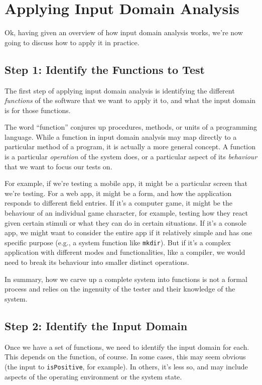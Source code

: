 \section{Applying Input Domain Analysis}

Ok, having given an overview of how input domain analysis works, we're now
going to discuss how to apply it in practice. 

\subsection*{Step 1: Identify the Functions to Test}

The first step of applying input domain analysis is identifying the different
{\it functions} of the software that we want to apply it to, and what the input
domain is for those functions. 

The word ``function'' conjures up procedures, methods, or units of a programming
language. While a function in input domain analysis may map directly to a
particular method of a program, it is actually a more general concept. A
function is a particular {\it operation} of the system does, or a particular
aspect of its {\it behaviour} that we want to focus our tests on. 

For example, if we're testing a mobile app, it might be a particular screen that
we're testing. For a web app, it might be a form, and how the application
responds to different field entries. If it's a computer game, it might be the
behaviour of an individual game character, for example, testing how they react
given certain stimuli or what they can do in certain situations. If it's a
console app, we might want to consider the entire app if it relatively simple
and has one specific purpose (e.g., a system function like {\tt mkdir}). But if
it's a complex application with different modes and functionalities, like a
compiler, we would need to break its behaviour into smaller distinct operations.

In summary, how we carve up a complete system into functions is not a formal
process and relies on the ingenuity of the tester and their knowledge of the
system.  

\subsection*{Step 2: Identify the Input Domain}

Once we have a set of functions, we need to identify the input domain for each.
This depends on the function, of course. In some cases, this may seem obvious
(the input to {\tt isPositive}, for example). In others, it's less so, and may
include aspects of the operating environment or the system state. 

